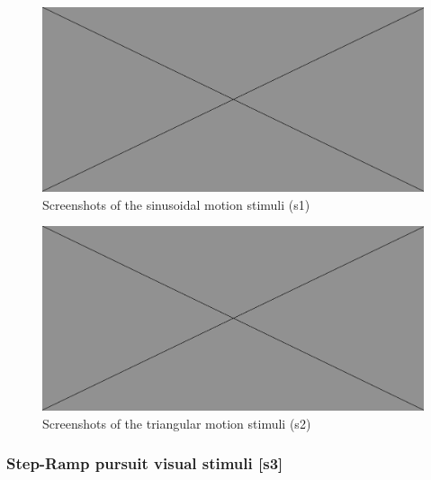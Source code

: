 \begin{figure}[h]
  \centering
  \includegraphics[width=.5\textwidth]{figures/placeholderImg.jpg}
  \caption[sinusoidal stimuli screenshots]{Screenshots of the sinusoidal motion stimuli (s1)}
  \label{fig:sinescreens}
\end{figure}

\begin{figure}[h]
  \centering
  \includegraphics[width=.5\textwidth]{figures/placeholderImg.jpg}
  \caption[triangular stimuli screenshots]{Screenshots of the triangular motion stimuli (s2)}
  \label{fig:triangscreens}
\end{figure}




\subsubsection{Step-Ramp pursuit visual stimuli [s3]}
\label{sec:expstepramp}

